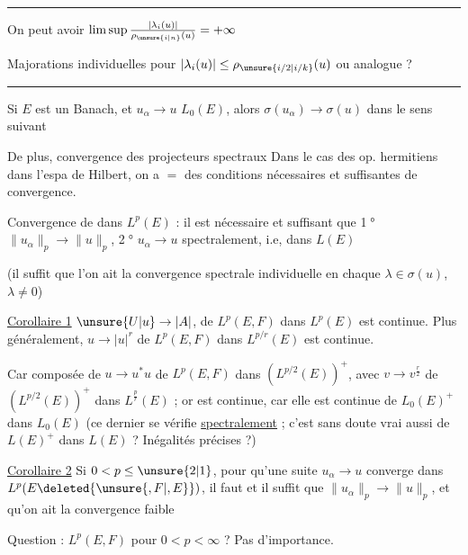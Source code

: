 \par\noindent\rule{\linewidth}{0.4pt}\par

 On peut avoir $\limsup\frac{|\lambda_i(u)|}{\rho_{\unsure{i|n}}(u)}=+\infty$

Majorations individuelles pour $|\lambda_i(u)|\leq\rho_{\unsure{i/2|i/k}}(u)$ ou analogue ?

\par\noindent\rule{\linewidth}{0.4pt}\par

Si $E$ est un Banach, et $u_\alpha\to u$  $L_0(E)$, alors $\sigma(u_\alpha)\to\sigma(u)$ dans le sens suivant

De plus, convergence des projecteurs spectraux  Dans le cas des op. hermitiens dans l'espa de Hilbert, on a $=$  des conditions nécessaires et suffisantes de convergence.

Convergence de   dans $L^p(E)$ : il est nécessaire et suffisant que \textcircled{\scriptsize 1°} $\|u_\alpha\|_p\to\|u\|_p$, \textcircled{\scriptsize 2°} $u_\alpha\to u$ spectralement, i.e, dans $L(E)$

(il suffit  que l'on ait la convergence spectrale individuelle en chaque $\lambda\in\sigma(u)$, $\lambda\neq0$)

\uline{Corollaire 1} $\unsure{U|u}\to|A|$, de $L^p(E,F)$ dans $L^p(E)$ est continue. Plus généralement, $u\to|u|^r$ de $L^p(E,F)$ dans $L^{p/r}(E)$ est continue.

Car composée de $u\to u^*u$ de $L^p(E,F)$ dans $(L^{p/2}(E))^+$, avec $v\to v^{\frac r2}$ de $(L^{p/2}(E))^+$ dans $L^{\frac pr}(E)$ ; or   est continue, car elle est continue de $L_0(E)^+$ dans $L_0(E)$ (ce dernier  se vérifie \uline{spectralement} ; c'est sans doute vrai aussi de $L(E)^+$ dans $L(E)$ ? Inégalités précises ?)

\uline{Corollaire 2} Si $0<p\leq\unsure{2|1}$, pour qu'une suite  $u_\alpha\to u$ converge dans $L^p(E\deleted{\unsure{,F|,E}})$, il faut et il suffit que $\|u_\alpha\|_p\to\|u\|_p$, et qu'on ait la convergence faible

Question :    $L^p(E,F)$  pour $0<p<\infty$ ? Pas d'importance.

